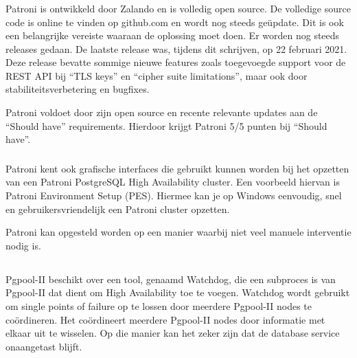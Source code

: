 \subsubsection{}
\label{subsubsec:Should have}

Patroni is ontwikkeld door Zalando en is volledig open source. De volledige source code is online te vinden op github.com en wordt nog steeds geüpdate. Dit is ook een belangrijke vereiste waaraan de oplossing moet doen. Er worden  nog steeds releases gedaan. De laatste release was, tijdens dit schrijven, op 22 februari 2021. Deze release bevatte sommige nieuwe features zoals toegevoegde support voor de REST API bij “TLS keys” en “cipher suite limitations”, maar ook door stabiliteitsverbetering en bugfixes.

Patroni voldoet door zijn open source en recente relevante updates aan de “Should have” requirements. Hierdoor krijgt Patroni 5/5 punten bij “Should have”.

\subsubsection{}
\label{subsubsec:Could have}

Patroni kent ook grafische interfaces die gebruikt kunnen worden bij het opzetten van een Patroni PostgreSQL High Availability cluster. Een voorbeeld hiervan is Patroni Environment Setup (PES). Hiermee kan je op Windows eenvoudig, snel en gebruikersvriendelijk een Patroni cluster opzetten.

Patroni kan opgesteld worden op een manier waarbij niet veel manuele interventie nodig is.



\subsection{}
\label{subsec: Oplossing 2: Pgpool-II}

\subsubsection{}
\label{subsubsec:Must have}

Pgpool-II beschikt over een tool, genaamd Watchdog, die een subproces is van Pgpool-II dat dient om High Availability toe te voegen. Watchdog wordt gebruikt om single points of failure op te lossen door meerdere Pgpool-II nodes te coördineren. Het coördineert meerdere Pgpool-II nodes door informatie met elkaar uit te wisselen. Op die manier kan het zeker zijn dat de database service onaangetast blijft.

